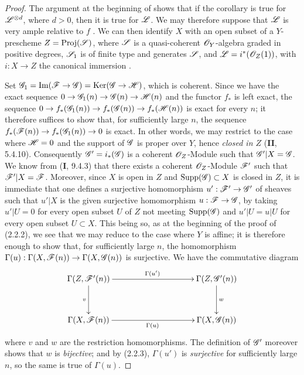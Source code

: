 \begin{proof}
The argument at the beginning of  shows that if the corollary is true for $\mathscr{L}^{\otimes d}$, where $d>0$, then it is true for $\mathscr{L}$.
We may therefore suppose that $\mathscr{L}$ is very ample relative to $f$ .
We can then identify $X$ with an open subset of a $Y$-prescheme $Z=\operatorname{Proj}(\mathscr{S})$,
where $\mathscr{S}$ is a quasi-coherent $\mathscr{O}_Y$-algebra graded in positive degrees, $\mathscr{S}_1$ is of finite type and generates $\mathscr{S}$, and $\mathscr{L}=i^*(\mathscr{O}_Z(1))$,
with $i:X\to Z$ the canonical immersion .

Set
$\mathscr{G}_1=\operatorname{Im}(\mathscr{F}\to\mathscr{G})
=\operatorname{Ker}(\mathscr{G}\to\mathscr{H})$, which is coherent. Since we have the
exact sequence $0\to\mathscr{G}_1(n)\to\mathscr{G}(n)\to\mathscr{H}(n)$ and the functor
$f_*$ is left exact, the sequence
$0\to f_*(\mathscr{G}_1(n))\to f_*(\mathscr{G}(n))\to f_*(\mathscr{H}(n))$ is exact for every
$n$; it therefore suffices to show that, for sufficiently large $n$, the
sequence $f_*(\mathscr{F}(n))\to f_*(\mathscr{G}_1(n))\to0$ is exact. In other words, we
may restrict to the case where $\mathscr{H}=0$ and the support of $\mathscr{G}$ is
proper over $Y$, hence \emph{closed in $Z$} (\textbf{II}, 5.4.10). Consequently
$\mathscr{G}'=i_*(\mathscr{G})$ is a coherent $\mathscr{O}_Z$-Module such that
$\mathscr{G}'|X=\mathscr{G}$. We know from (\textbf{I}, 9.4.3) that there exists a coherent
$\mathscr{O}_Z$-Module $\mathscr{F}'$ such that $\mathscr{F}'|X=\mathscr{F}$. Moreover, since $X$
is open in $Z$ and $\operatorname{Supp}(\mathscr{G})\subset X$ is closed in $Z$, it
is immediate that one defines a surjective homomorphism
$u':\mathscr{F}'\to\mathscr{G}'$ of sheaves such that $u'|X$ is the given surjective
homomorphism $u:\mathscr{F}\to\mathscr{G}$, by taking $u'|U=0$ for every open subset $U$
of $Z$ not meeting $\operatorname{Supp}(\mathscr{G})$ and $u'|U=u|U$ for every open
subset $U\subset X$. This being so, as at the beginning of the proof of
(2.2.2), we see that we may reduce to the case where $Y$ is affine; it is
therefore enough to show that, for sufficiently large $n$, the homomorphism
$\Gamma(u):\Gamma(X,\mathscr{F}(n))\to\Gamma(X,\mathscr{G}(n))$ is surjective. We have
the commutative diagram
\[
\xymatrix@C=35mm@R=12mm{
\Gamma(Z,\sh{F}'(n)) \ar[r]^{\Gamma(u')} \ar[d]_v &
\Gamma(Z,\sh{G}'(n)) \ar[d]^w \\
\Gamma(X,\sh{F}(n)) \ar[r]_{\Gamma(u)} & \Gamma(X,\sh{G}(n))
}
\]
where $v$ and $w$ are the restriction homomorphisms. The definition of
$\mathscr{G}'$ moreover shows that $w$ is \emph{bijective}; and by (2.2.3),
$\Gamma(u')$ is \emph{surjective} for sufficiently large $n$, so the same is
true of $\Gamma(u)$.
\end{proof}

